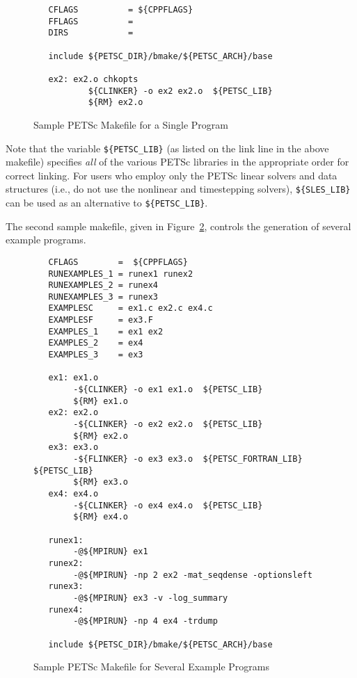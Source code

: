 {\begin{figure}[H]
{\begin{verbatim}
   CFLAGS          = ${CPPFLAGS} 
   FFLAGS          = 
   DIRS            = 

   include ${PETSC_DIR}/bmake/${PETSC_ARCH}/base

   ex2: ex2.o chkopts
           ${CLINKER} -o ex2 ex2.o  ${PETSC_LIB}
           ${RM} ex2.o
\end{verbatim}
}
\caption{Sample PETSc Makefile for a Single Program}
\label{fig:make1}
\end{figure}


 
Note that the variable {\tt \$\{PETSC\_LIB\}} (as listed on the link
line in the above makefile) specifies {\em all} of the various PETSc
libraries in the appropriate order for correct linking.  For users who
employ only the PETSc linear solvers and data structures (i.e., do not
use the nonlinear and timestepping solvers), {\tt \$\{SLES\_LIB\}} can
be used as an alternative to {\tt \$\{PETSC\_LIB\}}.

The second sample makefile, given in Figure~\ref{fig:make2},
controls the generation of several example programs. 

\begin{figure}[H]
{\small
\begin{verbatim}
   CFLAGS        =  ${CPPFLAGS}
   RUNEXAMPLES_1 = runex1 runex2
   RUNEXAMPLES_2 = runex4
   RUNEXAMPLES_3 = runex3
   EXAMPLESC     = ex1.c ex2.c ex4.c
   EXAMPLESF     = ex3.F
   EXAMPLES_1    = ex1 ex2
   EXAMPLES_2    = ex4
   EXAMPLES_3    = ex3

   ex1: ex1.o 
        -${CLINKER} -o ex1 ex1.o  ${PETSC_LIB}
        ${RM} ex1.o
   ex2: ex2.o 
        -${CLINKER} -o ex2 ex2.o  ${PETSC_LIB}
        ${RM} ex2.o
   ex3: ex3.o 
        -${FLINKER} -o ex3 ex3.o  ${PETSC_FORTRAN_LIB} ${PETSC_LIB}
        ${RM} ex3.o
   ex4: ex4.o 
        -${CLINKER} -o ex4 ex4.o  ${PETSC_LIB}
        ${RM} ex4.o

   runex1:
        -@${MPIRUN} ex1
   runex2:
        -@${MPIRUN} -np 2 ex2 -mat_seqdense -optionsleft
   runex3:
        -@${MPIRUN} ex3 -v -log_summary
   runex4:
        -@${MPIRUN} -np 4 ex4 -trdump

   include ${PETSC_DIR}/bmake/${PETSC_ARCH}/base
\end{verbatim}
}
\caption{Sample PETSc Makefile for Several Example Programs}
\label{fig:make2}
\end{figure}

}
